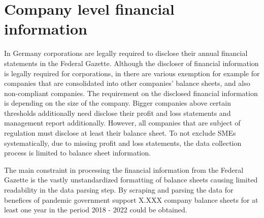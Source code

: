 \section{Company level financial information}

In Germany corporations are legally required to disclose their annual financial statements in the Federal Gazette. Although the discloser of financial information is legally required for corporations, in there are various exemption for example for companies that are consolidated into other companies’ balance sheets, and also non-compliant companies.
The requirement on the disclosed financial information is depending on the size of the company. Bigger companies above certain thresholds additionally need disclose their profit and loss statements and management report additionally. However, all companies that are subject of regulation must disclose at least their balance sheet. 
To not exclude SMEs systematically, due to missing profit and loss statements, the data collection process is limited to balance sheet information. 

The main constraint in processing the financial information from the Federal Gazette is the vastly unstandardized formatting of balance sheets causing limited readability in the data parsing step. By scraping and parsing the data for benefices of pandemic government support X.XXX company balance sheets for at least one year in the period 2018 - 2022 could be obtained. 
